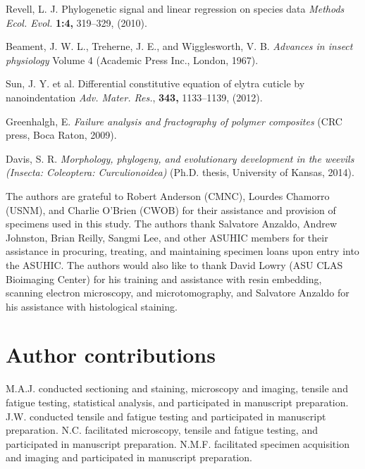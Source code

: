 \documentclass[twocolumn, linenumbers, superscriptaddress, nofootinbib]{revtex4-1}
\begin{document}
\begin{thebibliography}{50}
				Revell, L. J.
				Phylogenetic signal and linear regression on species data
				\textit{Methods Ecol. Evol.}
				\textbf{1:4,}
				319--329,
				(2010).
			
				Beament, J. W. L., Treherne, J. E., and Wigglesworth, V. B.
				\textit{Advances in insect physiology}
				Volume 4
				(Academic Press Inc.,
				London,
				1967).
			
				Sun, J. Y. et al.
				Differential constitutive equation of elytra cuticle by nanoindentation
				\textit{Adv. Mater. Res.},
				\textbf{343,}
				1133--1139,
				(2012).
			
				Greenhalgh, E.
				\textit{Failure analysis and fractography of polymer composites}
				(CRC press,
				Boca Raton,
				2009).
				
				Davis, S. R.
				\textit{Morphology, phylogeny, and evolutionary development in the	weevils (Insecta: Coleoptera: Curculionoidea)}
				(Ph.D. thesis,
				University of	Kansas,
				2014).
	\end{thebibliography}

	\begin{acknowledgements}
		The authors are grateful to Robert Anderson (CMNC), Lourdes Chamorro (USNM), and Charlie O'Brien (CWOB) for their assistance and provision of specimens used in this study.
		The authors thank Salvatore Anzaldo, Andrew Johnston, Brian Reilly, Sangmi Lee, and other ASUHIC members for their assistance in procuring, treating, and maintaining specimen loans upon entry into the ASUHIC.
		The authors would also like to thank David Lowry (ASU CLAS Bioimaging Center) for his training and assistance with resin embedding, scanning electron microscopy, and microtomography, and Salvatore Anzaldo for his assistance with histological staining.
	\end{acknowledgements}

	\section*{Author contributions}
		M.A.J. conducted sectioning and staining, microscopy and imaging, tensile and fatigue testing, statistical analysis, and participated in manuscript preparation.
		J.W. conducted tensile and fatigue testing and participated in manuscript preparation.
		N.C. facilitated microscopy, tensile and fatigue testing, and participated in manuscript preparation.
		N.M.F. facilitated specimen acquisition and imaging and participated in manuscript preparation.
	
\end{document}

